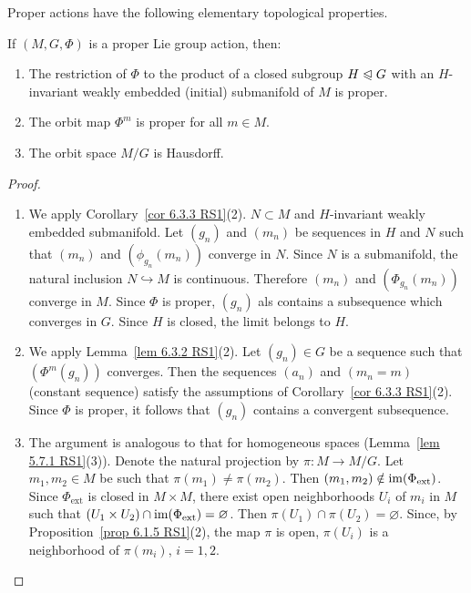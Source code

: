 Proper actions have the following elementary topological properties.

\begin{prop}[{{\cite[Prop.~6.3.4]{RS1}}}]\label{prop 6.3.4 RS1}
    If $(M,G,\Phi)$ is a proper Lie group action, then:
    \begin{enumerate}
        \item The restriction of $\Phi$ to the product of a closed subgroup $H\trianglelefteqslant G$ with an $H$-invariant weakly embedded (initial) submanifold  of $M$ is proper.
        \item The orbit map $\Phi^m$ is proper for all $m\in M$.
        \item The orbit space $M\slash G$ is Hausdorff.
    \end{enumerate}
\end{prop}
\begin{proof}
    \begin{enumerate}
        \item We apply Corollary~\ref{cor 6.3.3 RS1}(2). $N\subset M$ and $H$-invariant weakly embedded submanifold. Let $(g_n)$ and $(m_n)$ be sequences in $H$ and $N$ such that $(m_n)$ and $(\phi_{g_n}(m_n))$ converge in $N$. Since $N$ is a submanifold, the natural inclusion $N\hookrightarrow M$ is continuous. Therefore $(m_n)$ and $(\Phi_{g_n}(m_n))$ converge in $M$. Since $\Phi $ is proper, $(g_n)$ als contains a subsequence which converges in $G$. Since $H$ is closed, the limit belongs to $H$.
        \item We apply Lemma~\ref{lem 6.3.2 RS1}(2). Let $(g_n)\in G$ be a sequence such that $(\Phi^m(g_n))$ converges. Then the sequences $(a_n)$ and $(m_n=m)$ (constant sequence) satisfy the assumptions of Corollary~\ref{cor 6.3.3 RS1}(2). Since $\Phi$ is proper, it follows that $(g_n)$ contains a convergent subsequence.
        \item The argument is analogous to that for homogeneous spaces (Lemma~\ref{lem 5.7.1 RS1}(3)). Denote the natural projection by $\pi:M\to M\slash G$. Let $m_1,m_2\in M$ be such that $\pi(m_1)\neq \pi(m_2)$. Then $(m_1,m_2)\notin \operatorname{im}(\Phi_{\mathrm{ext}})$. Since $\Phi_{\mathrm{ext}}$ is closed in $M\times M$, there exist open neighborhoods $U_i$ of $m_i$ in $M$ such that $(U_1\times U_2)\cap \operatorname{im}(\Phi_{\mathrm{ext}})=\varnothing$. Then $\pi(U_1)\cap\pi(U_2)=\varnothing$. Since, by Proposition~\ref{prop 6.1.5 RS1}(2), the map $\pi$ is open, $\pi(U_i)$ is a neighborhood of $\pi(m_i)$, $i=1,2$.
    \end{enumerate}
\end{proof}


